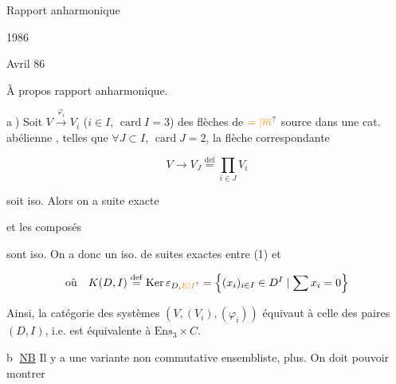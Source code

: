 Rapport anharmonique

 1986


Avril 86

À propos rapport anharmonique.

\textcircled{a)} Soit $V\xrightarrow{\varphi_i}V_i$ ($i\in I$, $\operatorname{card} I=3$) des flèches de $\unsure{=|\overline{m}}$ source dans une cat. abélienne , telles que $\forall J\subset I$, $\operatorname{card} J=2$, la flèche correspondante 

\[
 V\longrightarrow V_J\overset{\mathrm{def}}{=}\prod_{i\in J}V_i
\]

soit iso.  Alors on a suite exacte


et les  composés


sont iso. On a donc un iso. de suites exactes entre (1) et


\[
 \text{où}\quad K(D,I)\overset{\mathrm{def}}{=}\operatorname{Ker}\varepsilon_{D,\unsure{E|I}}
 =\left\{(x_i)_{i\in I}\in D^I\mid\sum x_i=0\right\}
\]

Ainsi, la catégorie des systèmes $(V,(V_i),(\varphi_i))$ équivaut à celle des paires $(D,I)$, i.e. est équivalente à $\mathrm{Ens}_3\times C$.

\textcircled{b} \uline{NB} Il y a une variante non commutative ensembliste,   plus.  On doit pouvoir montrer

